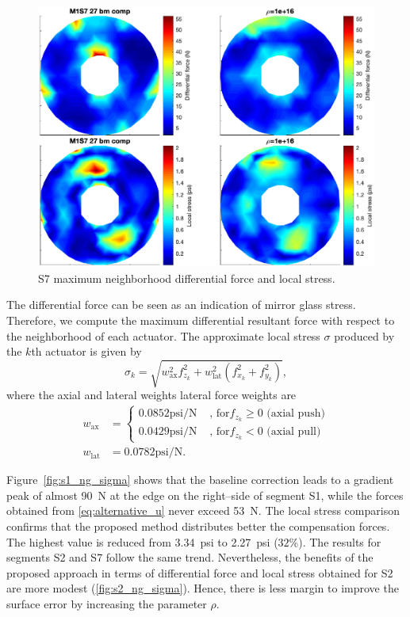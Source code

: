 \documentclass{gmto}
\begin{document}
\begin{figure}[!htb]
\centering
\includegraphics[width=\textwidth]{./pictures/s7_NG_sigma.eps}
\caption{\textsf{S7} maximum neighborhood differential force and local stress.}
\label{fig:s7_ng_sigma}
\end{figure}
The differential force can be seen as an indication of mirror glass stress. %
Therefore, we compute the maximum differential resultant force with respect to the  neighborhood of each actuator. The approximate local stress $\sigma$ produced by the $k$th actuator is given by \cite[Subsection~4.1.6]{gmtM1req}
\[\sigma_k = \sqrt{w_\text{ax}^2 f_{z_k}^2 + w_\text{lat}^2\left(f_{x_k}^2 + f_{y_k}^2\right)}, \]
%
where the axial and lateral weights lateral force weights are
\begin{align*}
    w_\text{ax} & = \left\{
    \begin{array}{ll}
         0.0852\text{psi/N} & \text{ , for} f_{z_k} \geq 0\text{ (axial push)}\\
         0.0429\text{psi/N} & \text{ , for} f_{z_k} < 0\text{ (axial pull)}
    \end{array}
    \right. \\
    w_\text{lat} & = 0.0782\text{psi/N}.
\end{align*}

Figure~\ref{fig:s1_ng_sigma} shows that the baseline correction leads to a gradient peak of almost \SI{90}{\newton} at the edge on the right--side of segment \textsf{S1}, while the forces obtained from \ref{eq:alternative_u} never exceed \SI{53}{\newton}. The local stress comparison confirms that the proposed method distributes better the compensation forces. The highest value is reduced from \SI{3.34}{psi} to \SI{2.27}{psi} ($32$\%). The results for segments \textsf{S2} and \textsf{S7} follow the same trend. Nevertheless, the benefits of the proposed approach in terms of differential force and local stress obtained for \textsf{S2} are more modest (\ref{fig:s2_ng_sigma}). Hence, there is less margin to improve the surface error by increasing the parameter $\rho$. %
\end{document}
